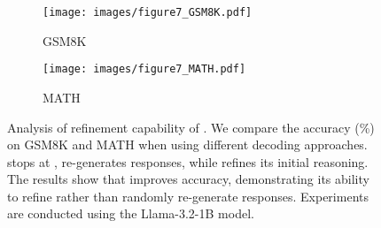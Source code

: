 \begin{figure}[t]
\begin{minipage}{\columnwidth}

    \centering
    \begin{subfigure}[t]{.495\textwidth}
    \texttt{[image: images/figure7\_GSM8K.pdf]} 
    \caption{GSM8K}
    \end{subfigure}
    \begin{subfigure}[t]{.495\textwidth}
    \texttt{[image: images/figure7\_MATH.pdf]} 
    \caption{MATH}
    \end{subfigure}
    \caption{Analysis of refinement capability of \sname. We compare the accuracy (\%) on GSM8K and MATH when using different decoding approaches. \first stops at \rethink, \retry re-generates responses, while \sname refines its initial reasoning. The results show that \sname improves accuracy, demonstrating its ability to refine rather than randomly re-generate responses. Experiments are conducted using the Llama-3.2-1B model.}
    \label{figure:analysis_refinement}

\end{minipage}
\vspace{-0.1in}
\end{figure}